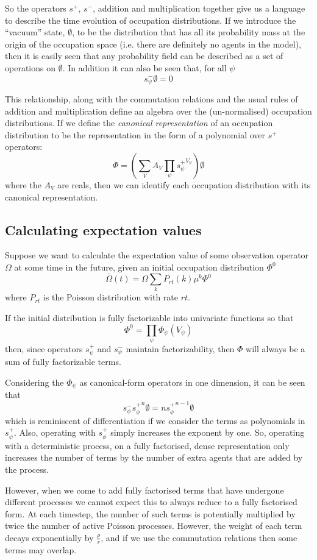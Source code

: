 \documentclass[a4paper]{article}
\begin{document}
So the operators $s^+$, $s^-$, addition and multiplication together give us a language to describe the time evolution of occupation distributions. If we introduce the ``vacuum'' state, $\emptyset$, to be the distribution that has all its probability mass at the origin of the occupation space (i.e. there are definitely no agents in the model), then it is easily seen that any probability field can be described as a set of operations on $\emptyset$. In addition it can also be seen that, for all $\psi$
\[
s^-_\psi\emptyset = 0
\]

This relationship, along with the commutation relations and the usual rules of addition and multiplication define an algebra over the (un-normalised) occupation distributions. If we define the \textit{canonical representation} of an occupation distribution to be the representation in the form of a polynomial over $s^+$ operators:
\[
\Phi = \left(\sum_V A_V\prod_\psi \left.s^+_\psi\right.^{V_\psi} \right)\emptyset
\]
where the $A_V$ are reals, then we can identify each occupation distribution with its canonical representation.

\subsection{Calculating expectation values}

Suppose we want to calculate the expectation value of some observation operator $\Omega$ at some time in the future, given an initial occupation distribution $\Phi^0$
\[
\bar{\Omega}(t) = \Omega \sum_{k} P_{rt}(k)\mu^k \Phi^0
\]
where $P_{rt}$ is the Poisson distribution with rate $rt$.

If the initial distribution is fully factorizable into univariate functions so that
\[
\Phi^0 = \prod_\psi \Phi_\psi(V_\psi)
\]
then, since operators $s^+_\psi$ and $s^-_\psi$ maintain factorizability, then $\Phi$ will always be a sum of fully factorizable terms. 

Considering the $\Phi_\psi$ as canonical-form operators in one dimension, it can be seen that
\[
s^-_\phi \left.s^+_\phi\right.^n\emptyset = n \left.s^+_\phi\right.^{n-1}\emptyset
\]
which is reminiscent of differentiation if we consider the terms as polynomials in $s^+_\psi$. Also, operating with $s^+_\phi$ simply increases the exponent by one. So, operating with a deterministic process, on a fully factorised, dense representation only increases the number of terms by the number of extra agents that are added by the process.

However, when we come to add fully factorised terms that have undergone different processes we cannot expect this to always reduce to a fully factorised form. At each timestep, the number of such terms is potentially multiplied by twice the number of active Poisson processes. However, the weight of each term decays exponentially by $\frac{\rho}{r}$, and if we use the commutation relations then some terms may overlap.
\end{document}
